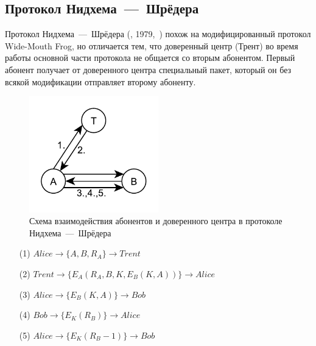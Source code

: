\subsection{Протокол Нидхема~---~Шрёдера}\label{section-protocols-needham-schroeder}

Протокол Нидхема~---~Шрёдера (, 1979,~\cite{Needham:Schroeder:1978}) похож на модифицированный протокол Wide-Mouth Frog, но отличается тем, что доверенный центр (Трент) во время работы основной части протокола не общается со вторым абонентом. Первый абонент получает от доверенного центра специальный пакет, который он без всякой модификации отправляет второму абоненту.

\begin{figure}
    \centering
    \includegraphics[width=0.5\textwidth]{pic/key_distribution-needham-schroeder}
    \caption{Схема взаимодействия абонентов и доверенного центра в протоколе Нидхема~---~Шрёдера\label{fig:key_distribution-needham-schroeder}}
\end{figure}

\begin{samepage}\begin{itemize}
	\item[(1)] $ Alice	\to \{ A, B, R_A \}						\to Trent $
	\item[(2)] $ Trent	\to \{ E_A \left( R_A, B, K, E_B \left( K, A \right) \right) \}	\to Alice $
	\item[(3)] $ Alice	\to \{ E_B \left( K, A \right) \}				\to Bob $
	\item[(4)] $ Bob	\to \{ E_K \left( R_B \right) \}				\to Alice $
	\item[(5)] $ Alice	\to \{ E_K \left( R_B - 1 \right) \}				\to Bob $
\end{itemize}\end{samepage}

